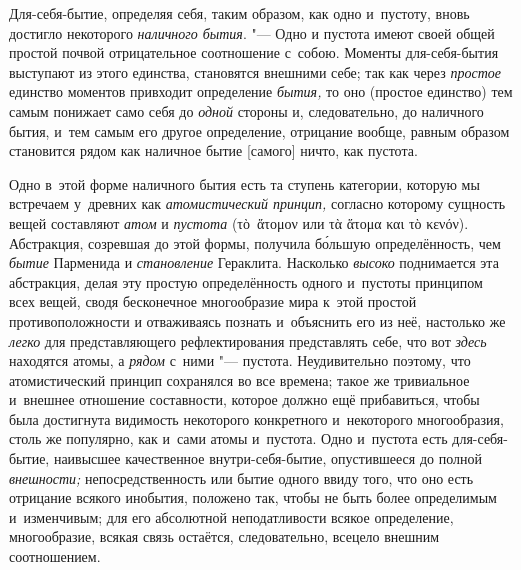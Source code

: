 Для-себя-бытие, определяя себя, таким образом, как одно и~пустоту, вновь
достигло некоторого {\em наличного бытия}. "--- Одно и
пустота имеют своей общей простой почвой отрицательное соотношение с~собою.
Моменты для-себя-бытия выступают из этого единства, становятся внешними
себе; так как через {\em простое} единство моментов
привходит определение {\em бытия,} то оно (простое
единство) тем самым понижает само себя до {\em одной}
стороны и, следовательно, до наличного бытия, и~тем самым его другое
определение, отрицание вообще, равным образом становится рядом как наличное
бытие [самого] ничто, как пустота.


Одно в~этой форме наличного бытия есть та ступень категории, которую мы
встречаем у~древних как {\em атомистический принцип,}
согласно которому сущность вещей составляют {\em атом} и {\em пустота}
(\textgreek{τὸ~ἅτομον} или \textgreek{τὰ ἅτομα και τὸ κενόν}).
Абстракция, созревшая до этой формы, получила б\'{о}льшую определённость, чем
{\em бытие} Парменида и {\em становление} Гераклита. Насколько
{\em высоко} поднимается эта абстракция, делая эту
простую определённость одного и~пустоты принципом всех вещей, сводя
бесконечное многообразие мира к~этой простой противоположности и
отваживаясь познать и~объяснить его из неё, настолько же
{\em легко} для представляющего рефлектирования
представлять себе, что вот {\em здесь} находятся атомы,
а {\em рядом} с~ними "--- пустота. Неудивительно поэтому,
что атомистический принцип сохранялся во все времена; такое же тривиальное
и~внешнее отношение составности, которое должно ещё прибавиться, чтобы была
достигнута видимость некоторого конкретного и~некоторого многообразия,
столь же популярно, как и~сами атомы и~пустота. Одно и~пустота есть
для-себя-бытие, наивысшее качественное внутри-себя-бытие, опустившееся до
полной {\em внешности;} непосредственность или бытие
одного ввиду того, что оно есть отрицание всякого инобытия, положено так,
чтобы не быть более определимым и~изменчивым; для его абсолютной
неподатливости всякое определение, многообразие, всякая связь остаётся,
следовательно, всецело внешним соотношением.

